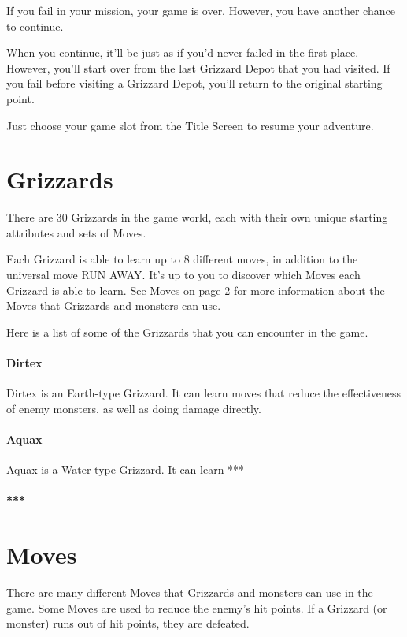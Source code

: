 \documentclass[12pt,twoside,openright,book]{memoir}
\begin{document}
\begin{description}
If you fail in your mission, your game is over. However, you have
another chance to continue.

When you continue, it'll  be just as if you'd never  failed in the first
place. However, you'll start over from  the last Grizzard Depot that you
had visited. If you fail before visiting a Grizzard Depot, you'll return
to the original starting point.

Just choose your game slot from the Title Screen to resume your
adventure.

\chapter{Grizzards}

There are  30 Grizzards in  the game world,  each with their  own unique
starting attributes and sets of Moves.

Each Grizzard is able  to learn up to 8 different  moves, in addition to
the universal move RUN AWAY. It's up to you to discover which Moves each
Grizzard  is able  to  learn. See  Moves on  page  \ref{Moves} for  more
information about the Moves that Grizzards and monsters can use.

Here  is a  list of  some of  the Grizzards  that you  can encounter  in
the game.

\subsubsection{Dirtex}

Dirtex is  an Earth-type Grizzard.  It can  learn moves that  reduce the
effectiveness of enemy monsters, as well as doing damage directly.

\subsubsection{Aquax}

Aquax is a Water-type Grizzard. It can learn ***

\subsubsection{***}

\chapter{Moves}\label{Moves}

There are  many different Moves that  Grizzards and monsters can  use in
the  game.  Some Moves  are  used  to  reduce  the enemy's  hit  points.
If a Grizzard (or monster) runs out of hit points, they are defeated.


\end{description}
\end{document}
